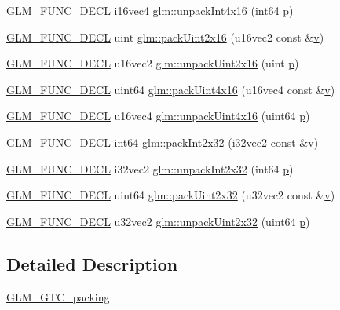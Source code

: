 \begin{DoxyCompactItemize}
\item 
\mbox{\hyperlink{setup_8hpp_ab2d052de21a70539923e9bcbf6e83a51}{G\+L\+M\+\_\+\+F\+U\+N\+C\+\_\+\+D\+E\+CL}} i16vec4 \mbox{\hyperlink{group__gtc__packing_ga625619888b95299a1ee0d9e50469c482}{glm\+::unpack\+Int4x16}} (int64 \mbox{\hyperlink{_s_d_l__opengl__glext_8h_aa5367c14d90f462230c2611b81b41d23}{p}})
\item 
\mbox{\hyperlink{setup_8hpp_ab2d052de21a70539923e9bcbf6e83a51}{G\+L\+M\+\_\+\+F\+U\+N\+C\+\_\+\+D\+E\+CL}} uint \mbox{\hyperlink{group__gtc__packing_gad5ca2e64edae3c233657c9fb0d18a9c9}{glm\+::pack\+Uint2x16}} (u16vec2 const \&\mbox{\hyperlink{_s_d_l__opengl_8h_a10a82eabcb59d2fcd74acee063775f90}{v}})
\item 
\mbox{\hyperlink{setup_8hpp_ab2d052de21a70539923e9bcbf6e83a51}{G\+L\+M\+\_\+\+F\+U\+N\+C\+\_\+\+D\+E\+CL}} u16vec2 \mbox{\hyperlink{group__gtc__packing_ga7778efa924e6efc386cb9f373bb06b72}{glm\+::unpack\+Uint2x16}} (uint \mbox{\hyperlink{_s_d_l__opengl__glext_8h_aa5367c14d90f462230c2611b81b41d23}{p}})
\item 
\mbox{\hyperlink{setup_8hpp_ab2d052de21a70539923e9bcbf6e83a51}{G\+L\+M\+\_\+\+F\+U\+N\+C\+\_\+\+D\+E\+CL}} uint64 \mbox{\hyperlink{group__gtc__packing_ga19813cb34dd7102f9612ba6c0d9ef377}{glm\+::pack\+Uint4x16}} (u16vec4 const \&\mbox{\hyperlink{_s_d_l__opengl_8h_a10a82eabcb59d2fcd74acee063775f90}{v}})
\item 
\mbox{\hyperlink{setup_8hpp_ab2d052de21a70539923e9bcbf6e83a51}{G\+L\+M\+\_\+\+F\+U\+N\+C\+\_\+\+D\+E\+CL}} u16vec4 \mbox{\hyperlink{group__gtc__packing_gaf1eea82404af955004aae19a2dcb55f1}{glm\+::unpack\+Uint4x16}} (uint64 \mbox{\hyperlink{_s_d_l__opengl__glext_8h_aa5367c14d90f462230c2611b81b41d23}{p}})
\item 
\mbox{\hyperlink{setup_8hpp_ab2d052de21a70539923e9bcbf6e83a51}{G\+L\+M\+\_\+\+F\+U\+N\+C\+\_\+\+D\+E\+CL}} int64 \mbox{\hyperlink{group__gtc__packing_ga1d6c24ff4f2b198eb2c4a2e4dcf7c336}{glm\+::pack\+Int2x32}} (i32vec2 const \&\mbox{\hyperlink{_s_d_l__opengl_8h_a10a82eabcb59d2fcd74acee063775f90}{v}})
\item 
\mbox{\hyperlink{setup_8hpp_ab2d052de21a70539923e9bcbf6e83a51}{G\+L\+M\+\_\+\+F\+U\+N\+C\+\_\+\+D\+E\+CL}} i32vec2 \mbox{\hyperlink{group__gtc__packing_ga6410b50fa48d15e70b2c34174ee4a3fc}{glm\+::unpack\+Int2x32}} (int64 \mbox{\hyperlink{_s_d_l__opengl__glext_8h_aa5367c14d90f462230c2611b81b41d23}{p}})
\item 
\mbox{\hyperlink{setup_8hpp_ab2d052de21a70539923e9bcbf6e83a51}{G\+L\+M\+\_\+\+F\+U\+N\+C\+\_\+\+D\+E\+CL}} uint64 \mbox{\hyperlink{group__gtc__packing_ga4c4e4d6ab81a6b14cf066b40b6967c0a}{glm\+::pack\+Uint2x32}} (u32vec2 const \&\mbox{\hyperlink{_s_d_l__opengl_8h_a10a82eabcb59d2fcd74acee063775f90}{v}})
\item 
\mbox{\hyperlink{setup_8hpp_ab2d052de21a70539923e9bcbf6e83a51}{G\+L\+M\+\_\+\+F\+U\+N\+C\+\_\+\+D\+E\+CL}} u32vec2 \mbox{\hyperlink{group__gtc__packing_gab211ea5f8cf86f00efa4fd53cb302c82}{glm\+::unpack\+Uint2x32}} (uint64 \mbox{\hyperlink{_s_d_l__opengl__glext_8h_aa5367c14d90f462230c2611b81b41d23}{p}})
\end{DoxyCompactItemize}


\subsection{Detailed Description}
\mbox{\hyperlink{group__gtc__packing}{G\+L\+M\+\_\+\+G\+T\+C\+\_\+packing}} 